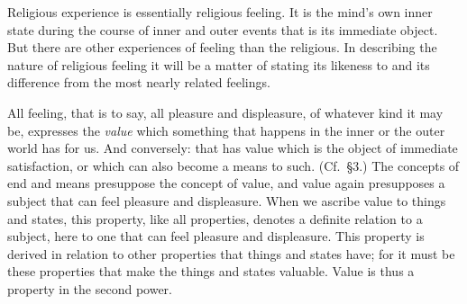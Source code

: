 \documentclass[12pt,a4paper]{book}
\begin{document}
Religious experience is essentially religious feeling. It is the mind's own
inner state during the course of inner and outer events that is its immediate
object. But there are other experiences of feeling than the religious. In
describing the nature of religious feeling it will be a matter of stating its
likeness to and its difference from the most nearly related feelings.

All feeling, that is to say, all pleasure and displeasure, of whatever kind it
may be, expresses the \emph{value} which something that happens in the inner
or the outer world has for us. And conversely: that has value which is the
object of immediate satisfaction, or which can also become a means to such.
(Cf.\ §3.) The concepts of end and means presuppose the concept of value, and
value again presupposes a subject that can feel pleasure and displeasure. When
we ascribe value to things and states, this property, like all properties,
denotes a definite relation to a subject, here to one that can feel pleasure
and displeasure. This property is derived in relation to other properties that
things and states have; for it must be these properties that make the things
and states valuable. Value is thus a property in the second power.
\end{document}
